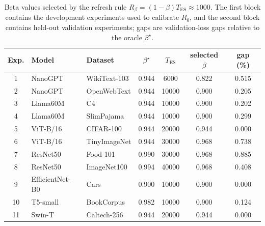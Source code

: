 \begin{table}[ht]
\centering
\small
\caption{Beta values selected by the refresh rule \(R_\beta=(1-\beta)T_{\mathrm{ES}}\approx1000\). The first block contains the development experiments used to calibrate \(R_0\), and the second block contains held-out validation experiments; gaps are validation-loss gaps relative to the oracle \(\beta^\star\).}
\label{tab:selected-betas}
\setlength{\tabcolsep}{4pt}
\begin{tabular*}{\textwidth}{@{\extracolsep{\fill}}cllcccc}
\toprule
Exp. & Model & Dataset & \(\beta^\star\) & \(T_{\mathrm{ES}}\) & selected \(\beta\) & gap (\%) \\
\midrule
1 & NanoGPT & WikiText-103 & 0.944 & 6000 & 0.822 & 0.515 \\
2 & NanoGPT & OpenWebText & 0.944 & 10000 & 0.900 & 0.205 \\
3 & Llama60M & C4 & 0.944 & 10000 & 0.900 & 0.202 \\
4 & Llama60M & SlimPajama & 0.944 & 10000 & 0.900 & 0.299 \\
5 & ViT-B/16 & CIFAR-100 & 0.944 & 20000 & 0.944 & 0.000 \\
6 & ViT-B/16 & TinyImageNet & 0.944 & 30000 & 0.968 & 0.738 \\
7 & ResNet50 & Food-101 & 0.990 & 30000 & 0.968 & 0.885 \\
8 & ResNet50 & ImageNet100 & 0.994 & 40000 & 0.968 & 0.408 \\
\midrule
9 & EfficientNet-B0 & Cars & 0.900 & 10000 & 0.900 & 0.000 \\
10 & T5-small & BookCorpus & 0.982 & 10000 & 0.900 & 0.124 \\
11 & Swin-T & Caltech-256 & 0.944 & 20000 & 0.944 & 0.000 \\
\bottomrule
\end{tabular*}
\end{table}
